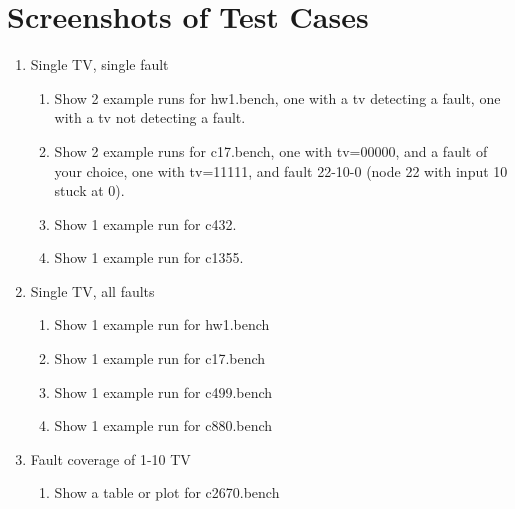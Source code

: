 \documentclass{article}
\begin{document}
    \section{Screenshots of Test Cases}
        \newcommand{\testtxt}[1]{}
        \begin{enumerate}[label=\Alph*.]
            \item Single TV, single fault
            \begin{enumerate}[label=\roman*.]
                \item Show 2 example runs for hw1.bench, one with a tv detecting a fault, one with a tv not detecting a fault.
                \testtxt{A.i.1}
                \testtxt{A.i.2}
                
                \item Show 2 example runs for c17.bench, one with tv=00000, and a fault of your choice, one with tv=11111, and fault 22-10-0 (node 22 with input 10 stuck at 0).
                \testtxt{A.ii.1}
                \testtxt{A.ii.2}

                \item Show 1 example run for c432.
                \testtxt{A.iii}

                \item Show 1 example run for c1355.
                \testtxt{A.iv}

            \end{enumerate}

            \item Single TV, all faults
            \begin{enumerate}[label=\roman*.]
                \item Show 1 example run for hw1.bench
                \testtxt{B.i}

                \item Show 1 example run for c17.bench
                \testtxt{B.ii}

                \item Show 1 example run for c499.bench
                \testtxt{B.iii}

                \item Show 1 example run for c880.bench
                \testtxt{B.iv}

            \end{enumerate}
            
            \item Fault coverage of 1-10 TV
            \begin{enumerate}[label=\roman*.]
                \item Show a table or plot for c2670.bench
                \testtxt{C.i}


\end{enumerate}
\end{enumerate}
\end{document}
